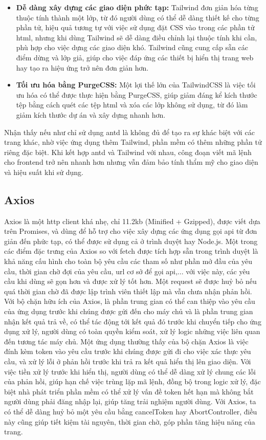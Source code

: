 \documentclass[./../main.tex]{subfiles}
\begin{document}
\begin{itemize}
    \item \textbf{Dễ dàng xây dựng các giao diện phức tạp:} Tailwind đơn giản hóa từng thuộc tính thành một lớp, từ đó người dùng có thể dễ dàng thiết kế cho từng phần tử, hiệu quả tương tự với việc sử dụng đặt CSS vào trong các phần tử \acrshort{html}, nhưng khi dùng Tailwind sẽ dễ dàng điều chỉnh lại thuộc tính khi cần, phù hợp cho việc dựng các giao diện khó. Tailwind cũng cung cấp sẵn các điểm dừng và lớp giả, giúp cho việc đáp ứng các thiết bị hiển thị trang web hay tạo ra hiệu ứng trở nên đơn giản hơn.
    \item \textbf{Tối ưu hóa bằng PurgeCSS:} Một lợi thế lớn của TailwindCSS là việc tối ưu hóa có thể được thực hiện bằng PurgeCSS, giúp giảm đáng kể kích thước tệp bằng cách quét các tệp \acrshort{html} và xóa các lớp không sử dụng, từ đó làm giảm kích thước dự án và xây dựng nhanh hơn.
\end{itemize}

Nhận thấy nếu như chỉ sử dụng \acrshort{antd} là không đủ để tạo ra sự khác biệt với các trang khác, nhờ việc ứng dụng thêm Tailwind, phần mềm có thêm những phần tử riêng đặc biệt. Khi kết hợp \acrshort{antd} và Tailwind với nhau, công đoạn viết mã lệnh cho frontend trở nên nhanh hơn nhưng vẫn đảm bảo tính thẩm mỹ cho giao diện và hiệu suất khi sử dụng.

\subsection{Axios}
Axios \cite{axios} là một \acrshort{http} client khá nhẹ, chỉ 11.2kb (Minified + Gzipped), được viết dựa trên Promises, và dùng để hỗ trợ cho việc xây dựng các ứng dụng gọi \acrshort{api} từ đơn giản đến phức tạp, có thể được sử dụng cả ở trình duyệt hay Node.js. Một trong các điểm đặc trưng của Axios so với fetch được tích hợp sẵn trong trình duyệt là khả năng cấu hình cho toàn bộ yêu cầu các tham số như phần mở đầu của yêu cầu, thời gian chờ đợi của yêu cầu, \acrshort{url} cơ sở để gọi \acrshort{api},... với việc này, các yêu cầu khi dùng sẽ gọn hơn và được xử lý tốt hơn. Một request sẽ được huỷ bỏ nếu quá thời gian chờ đã được lập trình viên thiết lập mà vẫn chưa nhận phản hồi. Với bộ chặn hữu ích của Axios, là phần trung gian có thể can thiệp vào yêu cầu của ứng dụng trước khi chúng được gửi đến cho máy chủ và là phần trung gian nhận kết quả trả về, có thể tác động tới kết quả đó trước khi chuyển tiếp cho ứng dụng xử lý, người dùng có toàn quyền kiểm soát, xử lý logic những việc liên quan đến tương tác máy chủ. Một ứng dụng thường thấy của bộ chặn Axios là việc đính kèm token vào yêu cầu trước khi chúng được gửi đi cho việc xác thực yêu cầu, và xử lý lỗi ở phản hồi trước khi trả ra kết quả hiển thị lên giao diện. Với việc tiền xử lý trước khi hiển thị, người dùng có thể dễ dàng xử lý chung các lỗi của phản hồi, giúp hạn chế việc trùng lặp mã lệnh, đồng bộ trong logic xử lý, đặc biệt nhà phát triển phần mềm có thể xử lý vấn đề token hết hạn mà không bắt người dùng phải đăng nhập lại, giúp tăng trải nghiệm người dùng. Với Axios, ta có thể dễ dàng huỷ bỏ một yêu cầu bằng cancelToken hay AbortController, điều này cũng giúp tiết kiệm tài nguyên, thời gian chờ, góp phần tăng hiệu năng của trang.
\end{document}
